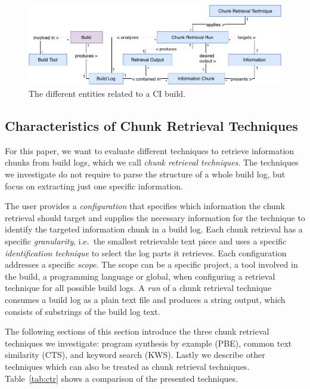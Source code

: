 \begin{figure}[!t]
	\centering
	\includegraphics[width=\columnwidth, clip]{img/build-overview.pdf}
	\caption{The different entities related to a CI build. }
	\label{fig:build-overview}
\end{figure}

\subsection{Characteristics of Chunk Retrieval Techniques}
\label{sec:blirt}
For this paper, we want to evaluate different techniques to retrieve information chunks from build logs, which we call \emph{chunk retrieval techniques}.
The techniques we investigate do not require to parse the structure of a whole build log, but focus on extracting just one specific information.

The user provides a \textit{configuration} that specifies which information the chunk retrieval should target and supplies the necessary information for the technique to identify the targeted information chunk in a build log.
Each chunk retrieval has a specific \textit{granularity}, i.e.\ the smallest retrievable text piece and uses a specific \textit{identification technique} to select the log parts it retrieves.
Each configuration addresses a specific \textit{scope}.
The scope can be a specific project, a tool involved in the build, a programming language or global, when configuring a retrieval technique for all possible build logs.
A \emph{run} of a chunk retrieval technique consumes a build log as a plain text file and produces a string output, which consists of substrings of the build log text.

The following sections of this section introduce the three chunk retrieval techniques we investigate: program synthesis by example (PBE), common text similarity (CTS), and keyword search (KWS).
Lastly we describe other techniques which can also be treated as chunk retrieval techniques.
Table~\ref{tab:ctr} shows a comparison of the presented techniques.

